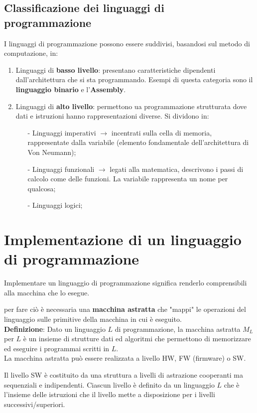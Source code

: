 \documentclass[a4paper, 10pt]{report}
\begin{document}
\subsection*{Classificazione dei linguaggi di programmazione}
I linguaggi di programmazione possono essere suddivisi, basandosi sul metodo di computazione, in:
\begin{enumerate}
\item Linguaggi di \textbf{basso livello}: presentano caratteristiche dipendenti dall'architettura che si sta programmando. Esempi di questa categoria sono il \textbf{linguaggio binario} e l'\textbf{Assembly}.
\item Linguaggi di \textbf{alto livello}: permettono ua programmazione strutturata dove dati e istruzioni hanno rappresentazioni diverse. Si dividono in:
	\begin{itemize}
	\item[-] Linguaggi imperativi $\rightarrow$ incentrati sulla cella di memoria, rappresentate dalla variabile (elemento fondamentale dell'architettura di Von Neumann);
	\item[-] Linguaggi funzionali $\rightarrow$ legati alla matematica, descrivono i passi di calcolo come delle funzioni. La variabile rappresenta un nome per qualcosa;
	\item[-] Linguaggi logici; 
	\end{itemize}
\end{enumerate} 

\section*{Implementazione di un linguaggio di programmazione}
Implementare un linguaggio di programmazione significa renderlo comprensibili alla macchina che lo esegue. 

per fare ciò è necessaria una \textbf{macchina astratta} che "mappi" le operazioni del linguaggio sulle primitive della macchina in cui è eseguito.\\

\noindent \textbf{Definizione}: Dato un linguaggio $L$ di programmazione, la macchina astratta $M_L$ per $L$ è un insieme di strutture dati ed algoritmi che permettono di memorizzare ed eseguire i programmai scritti in $L$.\\
 
\noindent La macchina astratta può essere realizzata a livello HW, FW (firmware) o SW. 

Il livello SW è costituito da una struttura a livelli di astrazione cooperanti ma sequenziali e indipendenti. Ciascun livello è definito da un linguaggio $L$ che è l'insieme delle istruzioni che il livello mette a disposizione per i livelli successivi/superiori.\\
\end{document}
